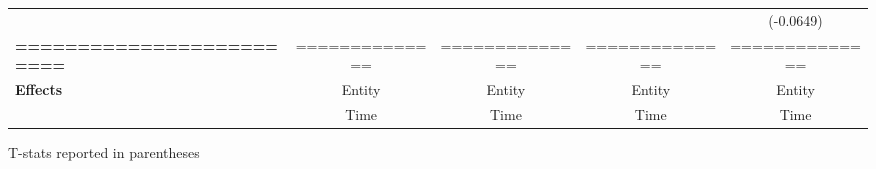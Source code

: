 \begin{center}
\begin{tabular}{lcccc}
\textbf{ }                         &                &                  &                  &    (-0.0649)      \\
\textbf{=========================} & ============== &  ==============  &  ==============  &  ==============   \\
\textbf{Effects}                   &     Entity     &      Entity      &      Entity      &      Entity       \\
\textbf{}                          &      Time      &       Time       &       Time       &       Time        \\
\bottomrule
\end{tabular}
\end{center}

T-stats reported in parentheses